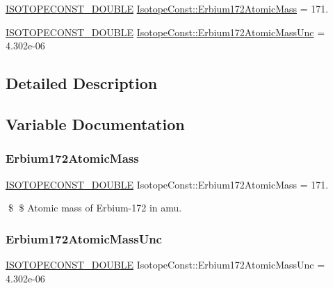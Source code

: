 \begin{DoxyCompactItemize}
\item 
\mbox{\hyperlink{group___isotope_const-_macros_ga8f45a7272ce02c0b4c65c44636ed719a}{I\+S\+O\+T\+O\+P\+E\+C\+O\+N\+S\+T\+\_\+\+D\+O\+U\+B\+LE}} \mbox{\hyperlink{group___isotope_const-_erbium-_er172_ga3cdd12595de274f6924d38d2f6100cc4}{Isotope\+Const\+::\+Erbium172\+Atomic\+Mass}} = 171.
\item 
\mbox{\hyperlink{group___isotope_const-_macros_ga8f45a7272ce02c0b4c65c44636ed719a}{I\+S\+O\+T\+O\+P\+E\+C\+O\+N\+S\+T\+\_\+\+D\+O\+U\+B\+LE}} \mbox{\hyperlink{group___isotope_const-_erbium-_er172_ga9d16dab3fbdb33de853d3ae15e6aabb0}{Isotope\+Const\+::\+Erbium172\+Atomic\+Mass\+Unc}} = 4.\+302e-\/06
\end{DoxyCompactItemize}


\subsection{Detailed Description}


\subsection{Variable Documentation}
\mbox{\label{group___isotope_const-_erbium-_er172_ga3cdd12595de274f6924d38d2f6100cc4}} 
\subsubsection{\texorpdfstring{Erbium172\+Atomic\+Mass}{Erbium172AtomicMass}}
{\footnotesize\ttfamily \mbox{\hyperlink{group___isotope_const-_macros_ga8f45a7272ce02c0b4c65c44636ed719a}{I\+S\+O\+T\+O\+P\+E\+C\+O\+N\+S\+T\+\_\+\+D\+O\+U\+B\+LE}} Isotope\+Const\+::\+Erbium172\+Atomic\+Mass = 171.}

\$ \$ Atomic mass of Erbium-\/172 in amu. \mbox{\label{group___isotope_const-_erbium-_er172_ga9d16dab3fbdb33de853d3ae15e6aabb0}} 
\subsubsection{\texorpdfstring{Erbium172\+Atomic\+Mass\+Unc}{Erbium172AtomicMassUnc}}
{\footnotesize\ttfamily \mbox{\hyperlink{group___isotope_const-_macros_ga8f45a7272ce02c0b4c65c44636ed719a}{I\+S\+O\+T\+O\+P\+E\+C\+O\+N\+S\+T\+\_\+\+D\+O\+U\+B\+LE}} Isotope\+Const\+::\+Erbium172\+Atomic\+Mass\+Unc = 4.\+302e-\/06}

